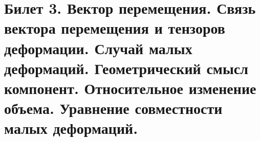 \newpage
\section{Билет 3. Вектор перемещения. Связь вектора перемещения и тензоров деформации. Случай малых деформаций. Геометрический смысл компонент. Относительное изменение объема. Уравнение совместности малых деформаций.}